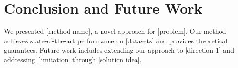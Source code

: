 \documentclass[10pt,twocolumn]{article}
\begin{document}
\section{Conclusion and Future Work}
\label{sec:conclusion}

We presented [method name], a novel approach for [problem]. Our method achieves state-of-the-art performance on [datasets] and provides theoretical guarantees. Future work includes extending our approach to [direction 1] and addressing [limitation] through [solution idea].




\end{document}
